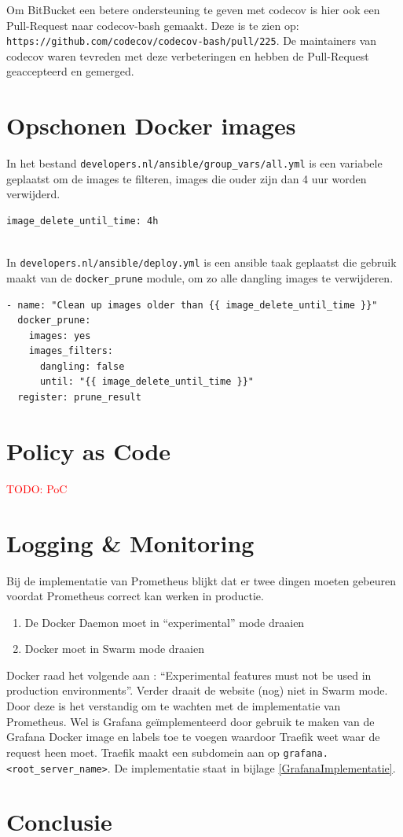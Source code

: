Om BitBucket een betere ondersteuning te geven met codecov is hier ook een Pull-Request naar codecov-bash gemaakt. Deze is te zien op:\\ \texttt{https://github.com/codecov/codecov-bash/pull/225}. De maintainers van codecov waren tevreden met deze verbeteringen en hebben de Pull-Request geaccepteerd en gemerged.

\section{Opschonen Docker images}
In het bestand \texttt{developers.nl/ansible/group\_vars/all.yml} is een variabele geplaatst om de images te filteren, images die ouder zijn dan 4 uur worden verwijderd.
\begin{verbatim}
image_delete_until_time: 4h
\end{verbatim}
\\In \texttt{developers.nl/ansible/deploy.yml} is een ansible taak geplaatst die gebruik maakt van de \texttt{docker\_prune} module, om zo alle dangling images te verwijderen.
\begin{verbatim}
- name: "Clean up images older than {{ image_delete_until_time }}"
  docker_prune:
    images: yes
    images_filters:
      dangling: false
      until: "{{ image_delete_until_time }}"
  register: prune_result
\end{verbatim}

\section{Policy as Code}

\textcolor{red}{TODO: PoC} %

\section{Logging \& Monitoring}
Bij de implementatie van Prometheus blijkt dat er twee dingen moeten gebeuren voordat Prometheus correct kan werken in productie. 
\begin{enumerate}
    \item De Docker Daemon moet in \enquote{experimental} mode draaien
    \item Docker moet in Swarm mode draaien
\end{enumerate}
Docker raad het volgende aan \parencite{DockerExperimental}: \enquote{Experimental features must not be used in production environments}. Verder draait de website (nog) niet in Swarm mode. Door deze is het verstandig om te wachten met de implementatie van Prometheus. Wel is Grafana geïmplementeerd door gebruik te maken van de Grafana Docker image en labels toe te voegen waardoor Traefik weet waar de request heen moet. Traefik maakt een subdomein aan op \texttt{grafana.<root\_server\_name>}. De implementatie staat in bijlage \ref{GrafanaImplementatie}.

\section{Conclusie}
